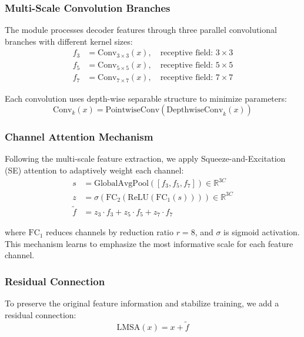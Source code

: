 \subsubsection{Multi-Scale Convolution Branches}

The module processes decoder features through three parallel convolutional branches with different kernel sizes:
\begin{align}
f_3 &= \text{Conv}_{3\times3}(x), \quad \text{receptive field: } 3\times3 \\
f_5 &= \text{Conv}_{5\times5}(x), \quad \text{receptive field: } 5\times5 \\
f_7 &= \text{Conv}_{7\times7}(x), \quad \text{receptive field: } 7\times7
\end{align}

Each convolution uses depth-wise separable structure to minimize parameters:
\begin{equation}
\text{Conv}_k(x) = \text{PointwiseConv}(\text{DepthwiseConv}_k(x))
\end{equation}

\subsubsection{Channel Attention Mechanism}

Following the multi-scale feature extraction, we apply Squeeze-and-Excitation (SE) attention to adaptively weight each channel:
\begin{align}
s &= \text{GlobalAvgPool}([f_3, f_5, f_7]) \in \mathbb{R}^{3C} \\
z &= \sigma(\text{FC}_2(\text{ReLU}(\text{FC}_1(s)))) \in \mathbb{R}^{3C} \\
\tilde{f} &= z_3 \cdot f_3 + z_5 \cdot f_5 + z_7 \cdot f_7
\end{align}

where $\text{FC}_1$ reduces channels by reduction ratio $r=8$, and $\sigma$ is sigmoid activation. This mechanism learns to emphasize the most informative scale for each feature channel.

\subsubsection{Residual Connection}

To preserve the original feature information and stabilize training, we add a residual connection:
\begin{equation}
\text{LMSA}(x) = x + \tilde{f}
\end{equation}


